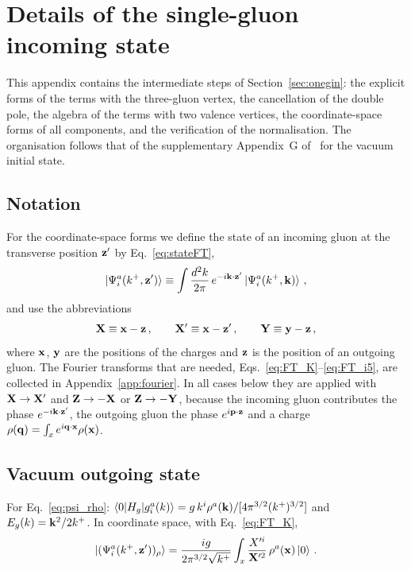 \section{Details of the single-gluon incoming state}\label{app:onegluon}

This appendix contains the intermediate steps of Section~\ref{sec:onegin}: the explicit forms of the terms with the three-gluon vertex, the cancellation of the double pole, the algebra of the terms with two valence vertices, the coordinate-space forms of all components, and the verification of the normalisation. The organisation follows that of the supplementary Appendix~G of~\cite{Lublinsky:2016meo} for the vacuum initial state.

\subsection{Notation}\label{app:onegluon_notation}

For the coordinate-space forms we define the state of an incoming gluon at the transverse position $\mathbf{z}'$ by Eq.~\eqref{eq:stateFT},
\begin{align}
\ket{\Psi^a_i(k^+,\mathbf{z}')}\equiv\int\frac{d^2k}{2\pi}\,e^{-i\mathbf{k}\cdot\mathbf{z}'}\ket{\Psi^a_i(k^+,\mathbf{k})}\,,
\end{align}
and use the abbreviations
\begin{align}\label{eq:XY}
\mathbf{X}\equiv\mathbf{x}-\mathbf{z}\,,\qquad \mathbf{X}'\equiv\mathbf{x}-\mathbf{z}'\,,\qquad \mathbf{Y}\equiv\mathbf{y}-\mathbf{z}\,,
\end{align}
where $\mathbf{x}$, $\mathbf{y}$ are the positions of the charges and $\mathbf{z}$ is the position of an outgoing gluon.
The Fourier transforms that are needed, Eqs.~\eqref{eq:FT_K}--\eqref{eq:FT_i5}, are collected in Appendix~\ref{app:fourier}. In all cases below they are applied with $\mathbf{X}\to\mathbf{X}'$ and $\mathbf{Z}\to-\mathbf{X}$ or $\mathbf{Z}\to-\mathbf{Y}$, because the incoming gluon contributes the phase $e^{-i\mathbf{k}\cdot\mathbf{z}'}$, the outgoing gluon the phase $e^{i\mathbf{p}\cdot\mathbf{z}}$ and a charge $\rho(\mathbf{q})=\int_xe^{i\mathbf{q}\cdot\mathbf{x}}\rho(\mathbf{x})$.

\subsection{Vacuum outgoing state}

For Eq.~\eqref{eq:psi_rho}: $\braket{0|H_g|g^a_i(k)}=g\,k^i\rho^a(\mathbf{k})/[4\pi^{3/2}(k^+)^{3/2}]$ and $E_g(k)=\mathbf{k}^2/2k^+$. In coordinate space, with Eq.~\eqref{eq:FT_K},
\begin{align}\label{eq:psi_rhoX}
\ket{(\Psi^a_i(k^+,\mathbf{z}'))_\rho}=\frac{ig}{2\pi^{3/2}\sqrt{k^+}}\int_x\frac{X'^i}{\mathbf{X}'^2}\,\rho^a(\mathbf{x})\ket0\,.
\end{align}

